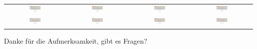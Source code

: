 \documentclass[compress,aspectratio=1610]{beamer}
\begin{document}
\begin{frame}
\begin{center}
\begin{tabular}{cccc}
      \includegraphics[page=11, width=0.2\textwidth]{figures/End.pdf} &
      \includegraphics[page=12, width=0.2\textwidth]{figures/End.pdf} &
      \includegraphics[page=13, width=0.2\textwidth]{figures/End.pdf} &
      \includegraphics[page=14, width=0.2\textwidth]{figures/End.pdf} \\

      \includegraphics[page=15, width=0.2\textwidth]{figures/End.pdf} &
      \includegraphics[page=16, width=0.2\textwidth]{figures/End.pdf} &
      \includegraphics[page=17, width=0.2\textwidth]{figures/End.pdf} &
      \includegraphics[page=18, width=0.2\textwidth]{figures/End.pdf} \\
    \end{tabular}
    \vspace{-0.2cm}
    \begin{center}
      Danke für die Aufmerksamkeit, gibt es Fragen?
    \end{center}
  \end{center}
\end{frame}
\end{document}
